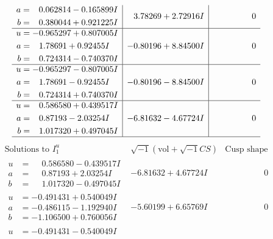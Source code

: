 \documentclass[1p]{elsarticle_modified}
\theoremstyle{definition}
\newcommand{\I}{\sqrt{-1}}
\begin{document}
$$\begin{array}{c|c|c}
\begin{aligned}
a &= \phantom{-}0.062814 - 0.165899 I \\
b &= \phantom{-}0.380044 + 0.921225 I\end{aligned}
 & \phantom{-}3.78269 + 2.72916 I & \phantom{-0.000000 } 0 \\ \hline\begin{aligned}
u &= -0.965297 + 0.807005 I \\
a &= \phantom{-}1.78691 + 0.92455 I \\
b &= \phantom{-}0.724314 - 0.740370 I\end{aligned}
 & -0.80196 + 8.84500 I & \phantom{-0.000000 } 0 \\ \hline\begin{aligned}
u &= -0.965297 - 0.807005 I \\
a &= \phantom{-}1.78691 - 0.92455 I \\
b &= \phantom{-}0.724314 + 0.740370 I\end{aligned}
 & -0.80196 - 8.84500 I & \phantom{-0.000000 } 0 \\ \hline\begin{aligned}
u &= \phantom{-}0.586580 + 0.439517 I \\
a &= \phantom{-}0.87193 - 2.03254 I \\
b &= \phantom{-}1.017320 + 0.497045 I\end{aligned}
 & -6.81632 - 4.67724 I & \phantom{-0.000000 } 0\\
 \hline 
 \end{array}$$\newpage$$\begin{array}{c|c|c}  
\text{Solutions to }I^u_{1}& \I (\text{vol} + \sqrt{-1}CS) & \text{Cusp shape}\\
 \hline 
\begin{aligned}
u &= \phantom{-}0.586580 - 0.439517 I \\
a &= \phantom{-}0.87193 + 2.03254 I \\
b &= \phantom{-}1.017320 - 0.497045 I\end{aligned}
 & -6.81632 + 4.67724 I & \phantom{-0.000000 } 0 \\ \hline\begin{aligned}
u &= -0.491431 + 0.540049 I \\
a &= -0.486115 - 1.192940 I \\
b &= -1.106500 + 0.760056 I\end{aligned}
 & -5.60199 + 6.65769 I & \phantom{-0.000000 } 0 \\ \hline\begin{aligned}
u &= -0.491431 - 0.540049 I \\

\end{aligned}
\end{array}$$
\end{document}
